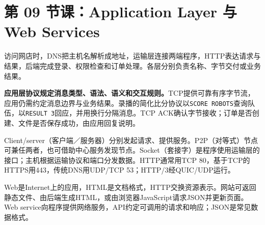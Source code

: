 \begingroup
\renewcommand{\recordid}[1]{}
\renewcommand{\relatedexercise}[2]{\hyperref[exercise:#1]{#2}}

\section{第 09 节课：Application Layer 与 Web Services}
\label{lecture:SC2008-L09}


访问网店时，DNS把主机名解析成地址，运输层连接两端程序，HTTP表达请求与结果，后端完成登录、权限检查和订单处理。各层分别负责名称、字节交付或业务结果。


\textbf{应用层协议规定消息类型、语法、语义和交互规则。}TCP提供可靠有序字节流，应用仍需约定消息边界与业务结果。录播的简化比分协议以\texttt{SCORE ROBOTS}查询队伍，以\texttt{RESULT 3}回应，并用换行分隔消息。TCP ACK确认字节接收；订单是否创建、文件是否保存成功，由应用回复说明。

Client/server（客户端／服务器）分别发起请求、提供服务。P2P（对等式）节点可兼任两者，也可借助中心服务发现节点。Socket（套接字）是程序使用运输层的接口；主机根据运输协议和端口分发数据。HTTP通常用TCP 80，基于TCP的HTTPS用443，传统DNS用UDP/TCP 53；HTTP/3经QUIC/UDP运行。

Web是Internet上的应用，HTML是文档格式，HTTP交换资源表示。网站可返回静态文件、由后端生成HTML，或由浏览器JavaScript请求JSON并更新页面。Web service向程序提供网络服务，API约定可调用的请求和响应；JSON是常见数据格式。

